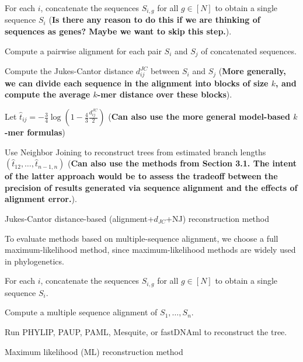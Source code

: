 \documentclass[12pt]{article}
\theoremstyle{definition}
\begin{document}
\begin{algorithm}[H]
 For each $i$, concatenate the sequences $S_{i,g}$ for all $g \in [N]$ to obtain a single sequence $S_{i}$ (\textbf{Is there any reason to do this if we are thinking of sequences as genes? Maybe we want to skip this step.}).

 Compute a pairwise alignment for each pair $S_{i}$ and $S_{j}$ of concatenated sequences. 

 Compute the Jukes-Cantor distance $d_{ij}^{JC}$ between $S_{i}$ and $S_{j}$ (\textbf{More generally, we can divide each sequence in the alignment into blocks of size $k$, and compute the average $k$-mer distance over these blocks}).

 Let $\hat{t}_{ij} = -\frac{3}{4}\log\left(1 - \frac{4}{3}\frac{d_{ij}^{JC}}{2}\right)$ (\textbf{Can also use the more general model-based $k$-mer formulas})

 Use Neighbor Joining to reconstruct trees from estimated branch lengths $(\hat{t}_{12}, \ldots, \hat{t}_{n-1,n})$ (\textbf{Can also use the methods from Section 3.1. The intent of the latter approach would be to assess the tradeoff between the precision of results generated via sequence alignment and the effects of alignment error.}).
            \caption{Jukes-Cantor distance-based (alignment+$d_{JC}$+NJ) reconstruction method}
 \label{algorithm:JCdistance}
\end{algorithm}

To evaluate methods based on multiple-sequence alignment, we choose a full maximum-likelihood method, since maximum-likelihood methods are widely used in phylogenetics.

\begin{algorithm}[H]
 For each $i$, concatenate the sequences $S_{i,g}$ for all $g \in [N]$ to obtain a single sequence $S_{i}$.

 Compute a multiple sequence alignment of $S_1, \ldots, S_n$.

 Run PHYLIP, PAUP, PAML, Mesquite, or fastDNAml to reconstruct the tree.
 \caption{Maximum likelihood (ML) reconstruction method}
 \label{algorithm:JCdistance}
\end{algorithm}
\end{document}
